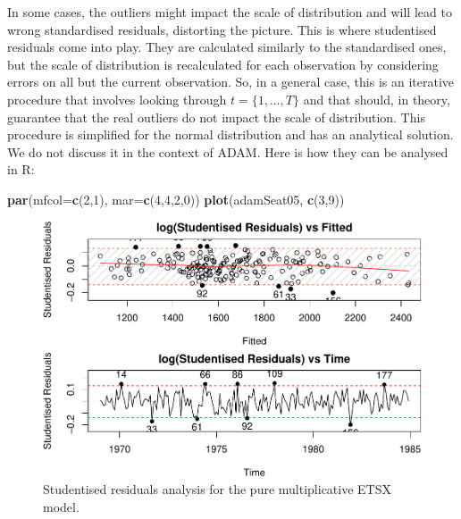 \documentclass[]{book}
\newenvironment{Shaded}{\begin{snugshade}}{\end{snugshade}}
\newcommand{\DataTypeTok}[1]{\textcolor[rgb]{0.13,0.29,0.53}{#1}}
\newcommand{\DecValTok}[1]{\textcolor[rgb]{0.00,0.00,0.81}{#1}}
\newcommand{\KeywordTok}[1]{\textcolor[rgb]{0.13,0.29,0.53}{\textbf{#1}}}
\newcommand{\NormalTok}[1]{#1}
\theoremstyle{definition}
\theoremstyle{definition}
\theoremstyle{definition}
\theoremstyle{definition}
\theoremstyle{remark}
\begin{document}
In some cases, the outliers might impact the scale of distribution and will lead to wrong standardised residuals, distorting the picture. This is where studentised residuals come into play. They are calculated similarly to the standardised ones, but the scale of distribution is recalculated for each observation by considering errors on all but the current observation. So, in a general case, this is an iterative procedure that involves looking through \(t=\{1,\dots,T\}\) and that should, in theory, guarantee that the real outliers do not impact the scale of distribution. This procedure is simplified for the normal distribution and has an analytical solution. We do not discuss it in the context of ADAM. Here is how they can be analysed in R:

\begin{Shaded}
\begin{Highlighting}[]
\KeywordTok{par}\NormalTok{(}\DataTypeTok{mfcol=}\KeywordTok{c}\NormalTok{(}\DecValTok{2}\NormalTok{,}\DecValTok{1}\NormalTok{), }\DataTypeTok{mar=}\KeywordTok{c}\NormalTok{(}\DecValTok{4}\NormalTok{,}\DecValTok{4}\NormalTok{,}\DecValTok{2}\NormalTok{,}\DecValTok{0}\NormalTok{))}
\KeywordTok{plot}\NormalTok{(adamSeat05, }\KeywordTok{c}\NormalTok{(}\DecValTok{3}\NormalTok{,}\DecValTok{9}\NormalTok{))}
\end{Highlighting}
\end{Shaded}

\begin{figure}
\centering
\includegraphics{Svetunkov--2022----ADAM_files/figure-latex/adamSeat05Student-1.pdf}
\caption{\label{fig:adamSeat05Student}Studentised residuals analysis for the pure multiplicative ETSX model.}
\end{figure}
\end{document}

